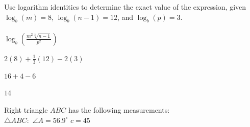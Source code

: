 \documentclass[11pt]{exam}
\begin{document}
\begin{questions}

\newpage

\question[5] Use logarithm identities to determine the exact value of the expression, given $\log_b(m)=8$, $\log_b(n-1)=12$, and $\log_b(p)=3$.\\ \\

\( \displaystyle \log_b\left(\frac{m^{2}\sqrt[3]{n-1}}{p^{2}}\right) \)
\begin{solution}
\(2(8) + \frac{1}{3}(12) - 2(3)\)

\(16 + 4 - 6\)

\(\boxed{14}\)
\end{solution}
\answerline

\newpage

\question[5] Right triangle $ABC$ has the following measurements:\\

$\triangle ABC:$ \qquad \(\angle A = 56.9^\circ\) \qquad \(c = 45\)\\
\end{questions}
\end{document}
